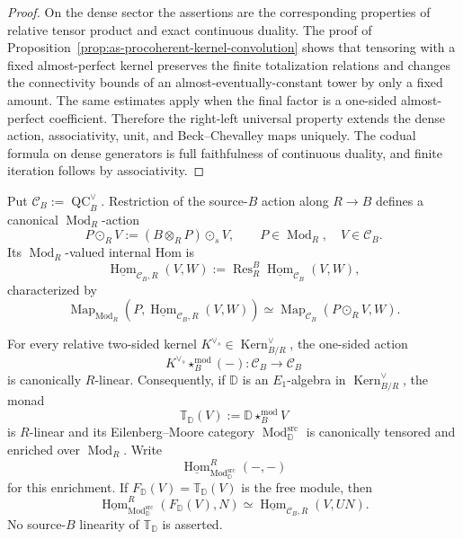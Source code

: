 \begin{proof}
On the dense sector the assertions are the corresponding properties of
relative tensor product and exact continuous duality.  The proof of
Proposition~\ref{prop:as-procoherent-kernel-convolution} shows that tensoring
with a fixed almost-perfect kernel preserves the finite totalization
relations and changes the connectivity bounds of an
almost-eventually-constant tower by only a fixed amount.  The same estimates
apply when the final factor is a one-sided almost-perfect coefficient.
Therefore the right-left universal property extends the dense action,
associativity, unit, and Beck--Chevalley maps uniquely.  The codual formula on
dense generators is full faithfulness of continuous duality, and finite
iteration follows by associativity.
\end{proof}

\begin{proposition}
\label{prop:as-relative-r-linear-enrichment}
Put $\mathcal C_B:=\operatorname{QC}^{\vee}_B$.  Restriction of the
source-$B$ action along $R\to B$ defines a canonical
$\operatorname{Mod}_R$-action
\[
\boxed{
    P\odot_RV
    :=
    (B\otimes_RP)\odot_sV,
    \qquad
    P\in\operatorname{Mod}_R,
    \quad
    V\in\mathcal C_B.
}
\]
Its $\operatorname{Mod}_R$-valued internal Hom is
\[
\boxed{
    \underline{\operatorname{Hom}}_{\mathcal C_B,R}(V,W)
    :=
    \operatorname{Res}_R^B
    \underline{\operatorname{Hom}}_{\mathcal C_B}(V,W),
}
\]
characterized by
\[
    \operatorname{Map}_{\operatorname{Mod}_R}
    \left(
        P,
        \underline{\operatorname{Hom}}_{\mathcal C_B,R}(V,W)
    \right)
    \simeq
    \operatorname{Map}_{\mathcal C_B}
    (P\odot_RV,W).
\]

For every relative two-sided kernel
$K^{\vee_s}\in\operatorname{Kern}^{\vee}_{B/R}$, the one-sided action
\[
    K^{\vee_s}\star_B^{\mathrm{mod}}(-):\mathcal C_B\to\mathcal C_B
\]
is canonically $R$-linear.  Consequently, if $\mathbb D$ is an $E_1$-algebra
in $\operatorname{Kern}^{\vee}_{B/R}$, the monad
\[
    \mathbb T_{\mathbb D}(V)
    :=
    \mathbb D\star_B^{\mathrm{mod}}V
\]
is $R$-linear and its Eilenberg--Moore category
$\operatorname{Mod}^{\mathrm{src}}_{\mathbb D}$ is canonically tensored and
enriched over $\operatorname{Mod}_R$.  Write
\[
    \underline{\operatorname{Hom}}^R_{
        \operatorname{Mod}^{\mathrm{src}}_{\mathbb D}}(-,-)
\]
for this enrichment.  If
$F_{\mathbb D}(V)=\mathbb T_{\mathbb D}(V)$ is the free module, then
\[
\boxed{
    \underline{\operatorname{Hom}}^R_{
        \operatorname{Mod}^{\mathrm{src}}_{\mathbb D}}
    (F_{\mathbb D}(V),N)
    \simeq
    \underline{\operatorname{Hom}}_{\mathcal C_B,R}(V,UN).
}
\]
No source-$B$ linearity of $\mathbb T_{\mathbb D}$ is asserted.
\end{proposition}

